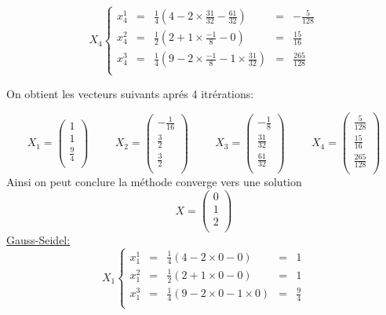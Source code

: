 \documentclass[a4paper,12pt]{article}
\begin{document}
$$
X_4 \left\{
\begin{array}{ccccc}
 x_4^1 & = & \frac{1}{4}(4-2\times\frac{31}{32} - \frac{61}{32} )& = &-\frac{5}{128} \\
 x_4^2 & = & \frac{1}{2}(2+1\times\frac{-1}{8} - 0 )& = &\frac{15}{16} \\
 x_4^3 & = & \frac{1}{4}(9-2\times\frac{-1}{8}-1\times\frac{31}{32})&=& \frac{265}{128}\\
\end{array}
\right.
$$

On obtient les vecteurs suivants apr\'es 4 itr\'erations:

$$
X_1=\left(
\begin{array}{c}
 1\\
 1\\
 \frac{9}{4}\\
\end{array}
\right)
\hspace{1cm}
X_2 = \left(
\begin{array}{c}
 -\frac{1}{16}\\
 \frac{3}{2}\\
 \frac{3}{2}\\
\end{array}
\right)
\hspace{1cm}
X_3 = \left(
\begin{array}{c}
 -\frac{1}{8}\\
 \frac{31}{32}\\
 \frac{61}{32}\\
\end{array}
\right)
\hspace{1cm}
X_4 = \left(
\begin{array}{c}
 \frac{5}{128}\\
 \frac{15}{16}\\
 \frac{265}{128}\\
\end{array}
\right)
$$
Ainsi on peut conclure la m\'ethode converge vers une solution 
$$
X = \left(
\begin{array}{c}
 0\\
 1\\
 2\\
\end{array}
\right)
$$
\underline{ Gauss-Seidel:}
$$
X_1 \left\{
\begin{array}{ccccc}
 x_1^1 & = & \frac{1}{4}(4-2\times0 - 0 )& = &1 \\
 x_1^2 & = & \frac{1}{2}(2+1\times0 - 0 )& = &1 \\
 x_1^3 & = & \frac{1}{4}(9-2\times0 -1\times 0 )& =& \frac{9}{4} \\
\end{array}
\right.
$$
\end{document}
